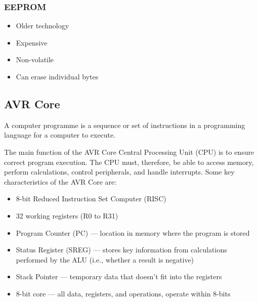 \documentclass{article}
\begin{document}
\subsubsection{EEPROM}
\begin{itemize}
    \item Older technology
    \item Expensive
    \item Non-volatile
    \item Can erase individual bytes
\end{itemize}
\subsection{AVR Core}
\begin{definition}
    A computer programme is a sequence or set of instructions in a programming language
    for a computer to execute.
\end{definition}
The main function of the AVR Core Central Processing Unit (CPU) is to ensure correct program execution.
The CPU must, therefore, be able to access memory, perform calculations, control peripherals, and handle interrupts.
Some key characteristics of the AVR Core are:
\begin{itemize}
    \item 8-bit Reduced Instruction Set Computer (RISC)
    \item 32 working registers (R0 to R31)
    \item Program Counter (PC) --- location in memory where the program is stored
    \item Status Register (SREG) --- stores key information from calculations performed by the ALU (i.e., whether a result is negative)
    \item Stack Pointer --- temporary data that doesn't fit into the registers
    \item 8-bit core --- all data, registers, and operations, operate within 8-bits
\end{itemize}
\end{document}
